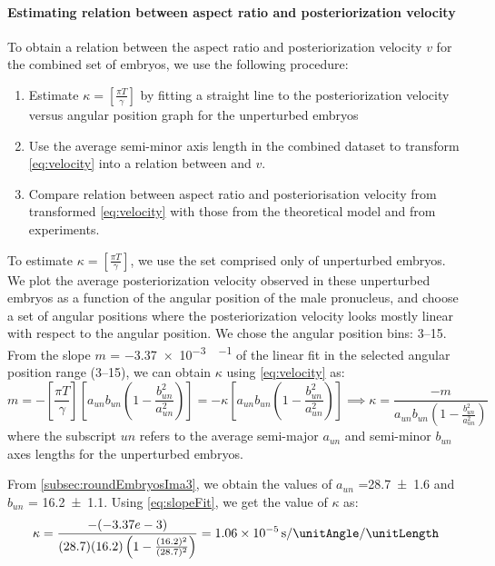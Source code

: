 \paragraph{Estimating relation between aspect ratio and posteriorization velocity}
To obtain a relation between the aspect ratio \aspectRatio and posteriorization velocity $v$ for the combined set of embryos, we use the following procedure:

\begin{enumerate}
    \item Estimate $\kappa = \left[\frac{\pi T}{\gamma}\right]$ by fitting a straight line to the posteriorization velocity versus angular position graph for the unperturbed embryos
    \item Use the average semi-minor axis length in the combined dataset to transform \eqref{eq:velocity} into a relation between \aspectRatio and $v$.
    \item Compare relation between aspect ratio and posteriorisation velocity from transformed \eqref{eq:velocity} with those from the theoretical model and from experiments.
\end{enumerate}

To estimate $\kappa = \left[\frac{\pi T}{\gamma}\right]$, we use the set comprised only of unperturbed embryos. We plot the average posteriorization velocity observed in these unperturbed embryos as a function of the angular position of the male pronucleus, and choose a set of angular positions where the posteriorization velocity looks mostly linear with respect to the angular position. We chose the angular position bins: \SIrange{3}{15}{\unitAngle}. From the slope $m$ = \SI{-3.37e-3}{\unitPostVel\per\unitAngle} of the linear fit in the selected angular position range (\SIrange{3}{15}{\unitAngle}), we can obtain $\kappa$ using \eqref{eq:velocity} as:
\begin{equation} \label{eq:slopeFit}
    m = - \left[\frac{\pi T}{\gamma}\right] \left[a_{un}b_{un}\left(1 - \frac{b_{un}^2}{a_{un}^2}\right)\right] = - \kappa \left[a_{un}b_{un}\left(1 - \frac{b_{un}^2}{a_{un}^2}\right)\right] \implies \kappa = \frac{-m}{a_{un}b_{un}\left(1 - \frac{b_{un}^2}{a_{un}^2}\right)}
\end{equation}
where the subscript $un$ refers to the average semi-major $a_{un}$ and semi-minor $b_{un}$ axes lengths for the unperturbed embryos.

From \autoref{subsec:roundEmbryosIma3}, we obtain the values of $a_{un}$ =\SI{28.7 +- 1.6}{\unitLength} and $b_{un}$ = \SI{16.2 +- 1.1}{\unitLength}. Using \eqref{eq:slopeFit}, we get the value of $\kappa$ as:
\begin{equation}\label{eq:kappa}
    \kappa = \frac{-(-3.37e-3)}{(28.7)(16.2)\left(1 - \frac{(16.2)^2}{(28.7)^2}\right)} = \SI{1.06e-5}{\per\second\per\unitAngle\per\unitLength}
\end{equation}

